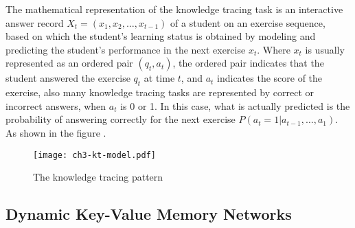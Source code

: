 The mathematical representation of the knowledge tracing task is an interactive answer record \(X_t=(x_1,x_2,\ldots,x_{t-1})\) of a student on an exercise sequence, based on which the student's learning status is obtained by modeling and predicting the student's performance in the next exercise \(x_{t}\). Where \(x_t\) is usually represented as an ordered pair \((q_t,a_t)\), the ordered pair indicates that the student answered the exercise \(q_t\) at time \(t\), and \(a_t\) indicates the score of the exercise, also many knowledge tracing tasks are represented by correct or incorrect answers, when \(a_t\) is 0 or 1. In this case, what is actually predicted is the probability of answering correctly for the next exercise \(P(a_{t}=1|a_{t-1},\ldots,a_1)\). As shown in the figure \figname{\ref{fig:ch3-model-ktdes}}.

\begin{figure}[htbp!]
    \centering
    \texttt{[image: ch3-kt-model.pdf]}
    \caption{The knowledge tracing pattern}\label{fig:ch3-model-ktdes}
\end{figure}

\subsection{Dynamic Key-Value Memory Networks}


